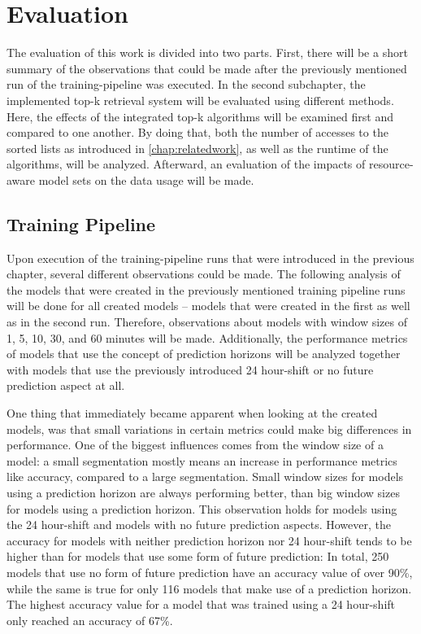 \chapter{Evaluation} \label{chap:evaluation}

The evaluation of this work is divided into two parts. First, there will be a short summary of the observations that could be made after the previously mentioned run of the training-pipeline was executed. In the second subchapter, the implemented top-k retrieval system will be evaluated using different methods. Here, the effects of the integrated top-k algorithms will be examined first and compared to one another. By doing that, both the number of accesses to the sorted lists as introduced in \autoref{chap:relatedwork}, as well as the runtime of the algorithms, will be analyzed. Afterward, an evaluation of the impacts of resource-aware model sets on the data usage will be made.
  
  
  
  \section{Training Pipeline}
  
  Upon execution of the training-pipeline runs that were introduced in the previous chapter, several different observations could be made. The following analysis of the models that were created in the previously mentioned training pipeline runs will be done for all created models – models that were created in the first as well as in the second run. Therefore, observations about models with window sizes of 1, 5, 10, 30, and 60 minutes will be made. Additionally, the performance metrics of models that use the concept of prediction horizons will be analyzed together with models that use the previously introduced 24 hour-shift or no future prediction aspect at all.
  
  One thing that immediately became apparent when looking at the created models, was that small variations in certain metrics could make big differences in performance. One of the biggest influences comes from the window size of a model: a small segmentation mostly means an increase in performance metrics like accuracy, compared to a large segmentation. Small window sizes for models using a prediction horizon are always performing better, than big window sizes for models using a prediction horizon. This observation holds for models using the 24 hour-shift and models with no future prediction aspects. However, the accuracy for models with neither prediction horizon nor 24 hour-shift tends to be higher than for models that use some form of future prediction: In total, 250 models that use no form of future prediction have an accuracy value of over 90\%, while the same is true for only 116 models that make use of a prediction horizon. The highest accuracy value for a model that was trained using a 24 hour-shift only reached an accuracy of 67\%. 
  
